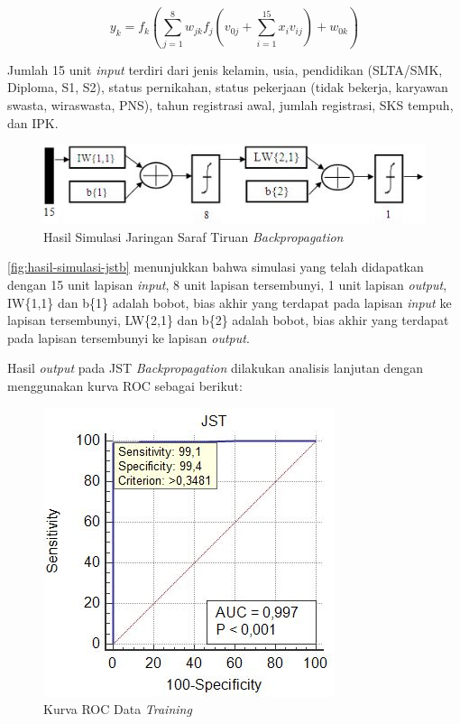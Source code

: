 \begin{equation}
    y_k = f_k \left(\sum_{j = 1}^{8} w_{jk} f_j \left(v_{0j} + \sum_{i = 1}^{15} x_i v_{ij} \right) + w_{0k}\right)  \label{eq:3}
\end{equation}

Jumlah 15 unit \textit{input} terdiri dari jenis kelamin, usia, pendidikan (SLTA/SMK, Diploma, S1, S2), status pernikahan, status pekerjaan (tidak bekerja, karyawan swasta, wiraswasta, PNS), tahun registrasi awal, jumlah registrasi, SKS tempuh, dan IPK.

\begin{figure}[H]
    \centering
    \includegraphics[width=.6\linewidth]{image/Hasil Simulasi JSTB.jpg}
    \caption{Hasil Simulasi Jaringan Saraf Tiruan \textit{Backpropagation}}
    \label{fig:hasil-simulasi-jstb}
\end{figure}

\autoref{fig:hasil-simulasi-jstb} menunjukkan bahwa simulasi yang telah didapatkan dengan 15 unit lapisan \textit{input}, 8 unit lapisan tersembunyi, 1 unit lapisan \textit{output}, IW\{1,1\} dan b\{1\} adalah bobot, bias akhir yang terdapat pada lapisan \textit{input} ke lapisan tersembunyi, LW\{2,1\} dan b\{2\} adalah bobot, bias akhir yang terdapat pada lapisan tersembunyi ke lapisan \textit{output}.

Hasil \textit{output} pada JST \textit{Backpropagation} dilakukan analisis lanjutan dengan menggunakan kurva ROC sebagai berikut:

\begin{figure}[H]
    \centering
    \hspace{-1.24cm}\includegraphics[width=.5\linewidth]{image/Kurva ROC Data Training.jpg}
    \caption{Kurva ROC Data \textit{Training}}
    \label{fig:kurva-roc-dataTraining}
\end{figure}

